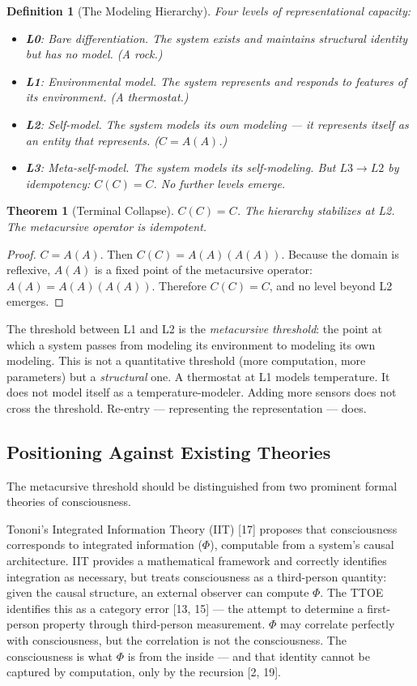 \documentclass[12pt, letterpaper]{article}
\newtheorem{definition}{Definition}[section]
\newtheorem{theorem}{Theorem}[section]
\begin{document}
\begin{definition}[The Modeling Hierarchy]
\label{def:modeling}
Four levels of representational capacity:
\begin{itemize}[nosep]
    \item \textbf{L0}: Bare differentiation. The system exists and maintains structural identity but has no model. (A rock.)
    \item \textbf{L1}: Environmental model. The system represents and responds to features of its environment. (A thermostat.)
    \item \textbf{L2}: Self-model. The system models its own modeling --- it represents itself as an entity that represents. ($C = A(A)$.)
    \item \textbf{L3}: Meta-self-model. The system models its self-modeling. But $L3 \to L2$ by idempotency: $C(C) = C$. No further levels emerge.
\end{itemize}
\end{definition}

\begin{theorem}[Terminal Collapse]
\label{thm:terminal}
$C(C) = C$. The hierarchy stabilizes at L2. The metacursive operator is idempotent.
\end{theorem}

\begin{proof}
$C = A(A)$. Then $C(C) = A(A)(A(A))$. Because the domain is reflexive, $A(A)$ is a fixed point of the metacursive operator: $A(A) = A(A)(A(A))$. Therefore $C(C) = C$, and no level beyond L2 emerges.
\end{proof}

The threshold between L1 and L2 is the \textit{metacursive threshold}: the point at which a system passes from modeling its environment to modeling its own modeling. This is not a quantitative threshold (more computation, more parameters) but a \textit{structural} one. A thermostat at L1 models temperature. It does not model itself as a temperature-modeler. Adding more sensors does not cross the threshold. Re-entry --- representing the representation --- does.

\subsection{Positioning Against Existing Theories}

The metacursive threshold should be distinguished from two prominent formal theories of consciousness.

Tononi's Integrated Information Theory (IIT) [17] proposes that consciousness corresponds to integrated information ($\Phi$), computable from a system's causal architecture. IIT provides a mathematical framework and correctly identifies integration as necessary, but treats consciousness as a third-person quantity: given the causal structure, an external observer can compute $\Phi$. The TTOE identifies this as a category error [13, 15] --- the attempt to determine a first-person property through third-person measurement. $\Phi$ may correlate perfectly with consciousness, but the correlation is not the consciousness. The consciousness is what $\Phi$ is from the inside --- and that identity cannot be captured by computation, only by the recursion [2, 19].
\end{document}
